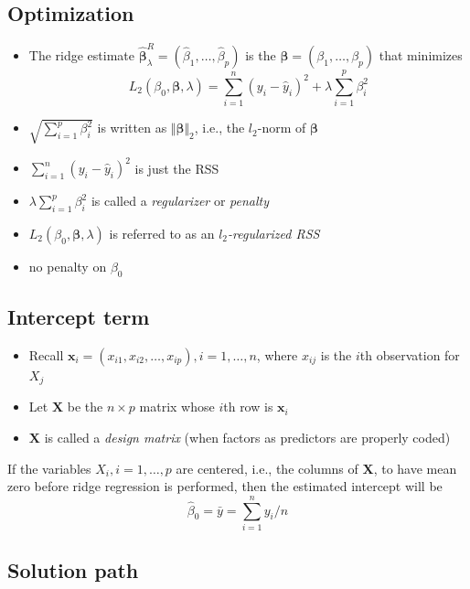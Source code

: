 \documentclass[]{article}
\providecommand{\tightlist}{%
  \setlength{\itemsep}{0pt}\setlength{\parskip}{0pt}}
\begin{document}
\subsection{Optimization}\label{optimization}

\begin{itemize}
\tightlist
\item
  The ridge estimate
  \(\hat{\boldsymbol{\beta}}^R_{\lambda}=(\hat{\beta}_1,\ldots,\hat{\beta}_p)\)
  is the \({\boldsymbol{\beta}}=({\beta}_1,\ldots,{\beta}_p)\) that
  minimizes \[
  L_2(\beta_0,\boldsymbol{\beta},\lambda)= \sum_{i=1}^n (y_i - \hat{y}_i)^2 + \lambda \sum_{i=1}^p \beta_i^2
  \]
\item
  \(\sqrt{\sum_{i=1}^p \beta_i^2}\) is written as
  \(\Vert\boldsymbol{\beta}\Vert_2\), i.e., the \(l_2\)-norm of
  \(\boldsymbol{\beta}\)\\
\item
  \(\sum_{i=1}^n (y_i - \hat{y}_i)^2\) is just the RSS
\item
  \(\lambda \sum_{i=1}^p \beta_i^2\) is called a \emph{regularizer} or
  \emph{penalty}
\item
  \(L_2(\beta_0,\boldsymbol{\beta},\lambda)\) is referred to as an
  \emph{\(l_2\)-regularized RSS}
\item
  no penalty on \(\beta_0\)
\end{itemize}

\subsection{Intercept term}\label{intercept-term}

\begin{itemize}
\tightlist
\item
  Recall \(\mathbf{x}_i=(x_{i1},x_{i2},\ldots,x_{ip}),i=1,\ldots,n\),
  where \(x_{ij}\) is the \(i\)th observation for \(X_j\)
\item
  Let \(\mathbf{X}\) be the \(n \times p\) matrix whose \(i\)th row is
  \(\mathbf{x}_i\)
\item
  \(\mathbf{X}\) is called a \emph{design matrix} (when factors as
  predictors are properly coded)
\end{itemize}

If the variables \(X_i,i=1,\ldots,p\) are centered, i.e., the columns of
\(\mathbf{X}\), to have mean zero before ridge regression is performed,
then the estimated intercept will be
\[\hat{\beta}_0=\bar{y}=\sum_{i=1}^n y_i/n\]

\subsection{Solution path}\label{solution-path}
\end{document}
